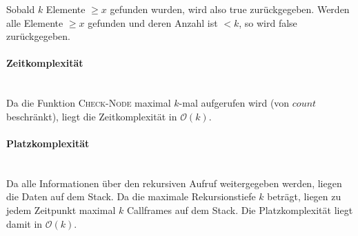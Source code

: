 \documentclass[a4paper]{scrartcl}
\begin{document}
Sobald $k$ Elemente $\geq x$ gefunden wurden, wird also true zurückgegeben.
Werden alle Elemente $\geq x$ gefunden und deren Anzahl ist $< k$, so wird false
zurückgegeben.

\paragraph{Zeitkomplexität} \hfill \\
Da die Funktion \textsc{Check-Node} maximal $k$-mal aufgerufen wird (von $count$
beschränkt), liegt die Zeitkomplexität in $\mathcal{O}(k)$.

\paragraph{Platzkomplexität} \hfill \\
Da alle Informationen über den rekursiven Aufruf weitergegeben werden, liegen
die Daten auf dem Stack.
Da die maximale Rekursionstiefe $k$ beträgt, liegen zu jedem Zeitpunkt maximal
$k$ Callframes auf dem Stack.
Die Platzkomplexität liegt damit in $\mathcal{O}(k)$.
\end{document}
